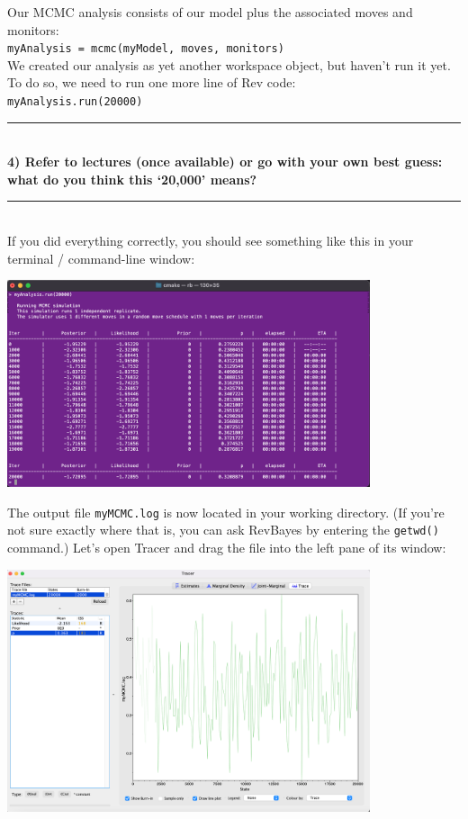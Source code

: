 \documentclass[12pt]{article}
\begin{document}
\noindent Our MCMC analysis consists of our model plus the associated moves and monitors: \\

\indent \texttt{myAnalysis = mcmc(myModel, moves, monitors)} \\

\noindent We created our analysis as yet another workspace object, but haven't run it yet. To do so, we need to run one more line of Rev code: \\

\indent \texttt{myAnalysis.run(20000)} \\

\hrule
\ \\[1ex]
\textbf{4) Refer to lectures (once available) or go with your own best guess: what do you think this `20,000' means?} \\
\hrule
\ \\[1ex]
\noindent If you did everything correctly, you should see something like this in your terminal / command-line window: \\

\begin{center}
\noindent\includegraphics[width=0.8\textwidth]{revbayes-screenlog.png}
\end{center}

\noindent The output file \texttt{myMCMC.log} is now located in your working directory. (If you're not sure exactly where that is, you can ask RevBayes by entering the \texttt{getwd()} command.) Let's open Tracer and drag the file into the left pane of its window: \\

\begin{center}
\noindent\includegraphics[width=0.8\textwidth]{tracer.png}
\end{center}
\end{document}
